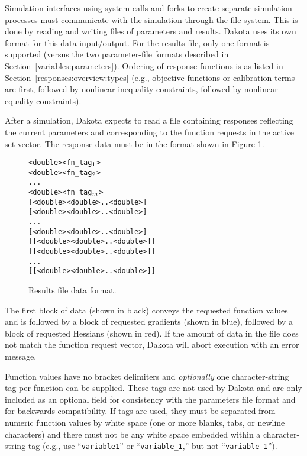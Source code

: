Simulation interfaces using system calls and forks to create
separate simulation processes must communicate with the simulation
through the file system. This is done by reading and
writing files of parameters and results. Dakota uses its own format
for this data input/output. For the results file, only one format is
supported (versus the two parameter-file formats described in
Section~\ref{variables:parameters}). Ordering of response functions is
as listed in Section~\ref{responses:overview:types} (e.g., objective
functions or calibration terms are first, followed by nonlinear
inequality constraints, followed by nonlinear equality constraints).

After a simulation, Dakota expects to read a file
containing responses reflecting the current parameters and
corresponding to the function requests in the active
set vector. The response data must be in the format
shown in Figure \ref{responses:figure01}.

\begin{figure}
  \centering
  \begin{bigbox}
  \begin{alltt}
    <double> <fn_tag\(\sb{1}\)>
    <double> <fn_tag\(\sb{2}\)>
    ...
    <double> <fn_tag\(\sb{m}\)> \color{blue}
    [ <double> <double> .. <double> ]
    [ <double> <double> .. <double> ]
    ...
    [ <double> <double> .. <double> ] \color{red}
    [[ <double> <double> .. <double> ]]
    [[ <double> <double> .. <double> ]]
    ...
    [[ <double> <double> .. <double> ]]
  \end{alltt}
  \end{bigbox}
  \caption{Results file data format.}
  \label{responses:figure01}
\end{figure}

The first block of data (shown in black) conveys the requested function values
and is followed by a block of requested gradients
(shown in blue), followed by a block of requested Hessians (shown
in red). If the amount of data in the file does not match the function
request vector, Dakota will abort execution with an error message.

Function values have no bracket delimiters and \emph{optionally} one
character-string tag per function can be supplied.  These tags are not
used by
Dakota and are only included as an optional field for consistency with
the parameters file format and for backwards compatibility.  If
tags are used, they must be separated from
numeric function values by white space (one or more blanks, tabs, or newline
characters) and there must not
be any white space embedded within a character-string tag (e.g., use
``\texttt{variable1}'' or ``\texttt{variable\_1},'' but not
``\texttt{variable 1}'').

